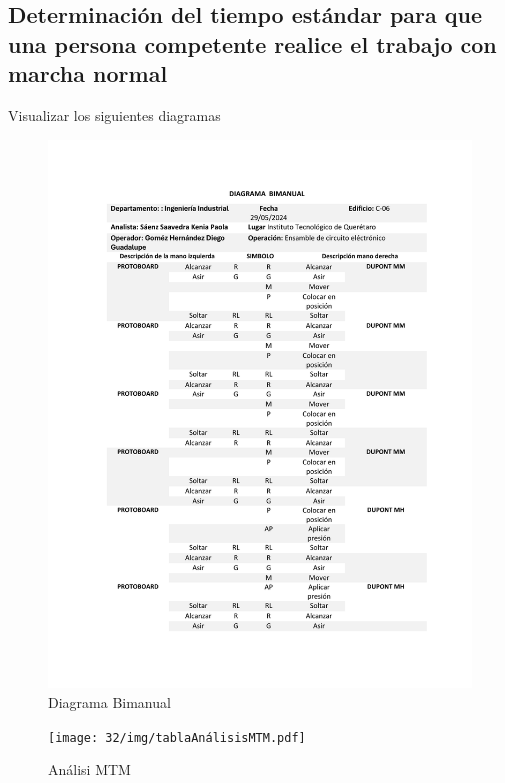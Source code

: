     \subsection{Determinación del tiempo estándar para que una persona competente realice el trabajo con marcha normal}
    Visualizar los siguientes diagramas
    \begin{figure}[H]
        \centering
        \includegraphics[scale=0.4]{32/img/diagramaBimanual.pdf}
        \caption{Diagrama Bimanual}
        \label{fig:enter-label}
    \end{figure}
    \begin{figure}[H]
        \centering
        \texttt{[image: 32/img/tablaAnálisisMTM.pdf]}
        \caption{Análisi MTM}
        \label{fig:enter-label}
    \end{figure}

